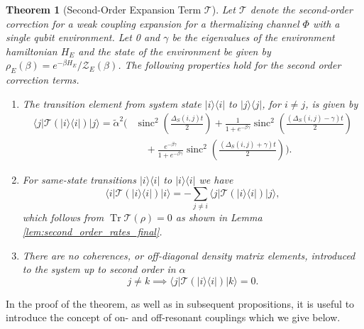 \documentclass[
 amsmath,amssymb,
 aps,
onecolumn, 
nofootinbib]{revtex4-2}
\newtheorem{theorem}{Theorem}
\newcommand{\ket}[1]{|#1\rangle}
\newcommand{\bra}[1]{\langle #1|}
\newcommand{\ketbra}[2]{| #1\rangle\! \langle #2|}
\DeclareMathOperator{\Tr}{Tr}
\newcommand{\partfun}{\mathcal{Z}}
\DeclareMathOperator{\sinc}{sinc}
\begin{document}
\begin{theorem}[Second-Order Expansion Term $\mathcal{T}$] \label{thm:second_order_transition}
Let $\mathcal{T}$ denote the second-order correction for a weak coupling expansion for a thermalizing channel $\Phi$ with a single qubit environment. Let 0 and $\gamma$ be the eigenvalues of the environment hamiltonian $H_E$ and the state of the environment be given by $\rho_E(\beta) = e^{-\beta H_E} / \partfun_E(\beta)$. The following properties hold for the second order correction terms.
\begin{enumerate}
    \item 
The transition element from system state $\ketbra{i}{i}$ to $\ketbra{j}{j}$, for $i \neq j$, is given by
\begin{align}
    \bra{j}\mathcal{T}(\ketbra{i}{i}) \ket{j} = \widetilde{\alpha}^2 \Biggr(& \sinc^2 \left( \frac{\Delta_S(i,j)t}{2} \right) + \frac{1}{1 + e^{-\beta \gamma}} \sinc^2 \left( \frac{(\Delta_S(i,j) - \gamma)t}{2} \right) \nonumber\\
    &\quad+  \frac{e^{-\beta \gamma}}{1 + e^{-\beta \gamma}} \sinc^2 \left( \frac{(\Delta_S(i,j) + \gamma)t}{2} \right) \Biggr). \label{eq:transition_terms_total}
\end{align}
\item For same-state transitions $\ketbra{i}{i}$ to $\ketbra{i}{i}$ we have
\begin{equation}
    \bra{i}\mathcal{T}(\ketbra{i}{i})\ket{i} = - \sum_{j \neq i} \bra{j} \mathcal{T}(\ketbra{i}{i}) \ket{j},
\end{equation}
which follows from $\Tr \mathcal{T}(\rho) = 0$ as shown in Lemma \ref{lem:second_order_rates_final}. 
\item There are no coherences, or off-diagonal density matrix elements, introduced to the system up to second order in $\alpha$
\begin{equation}
    j \neq k \implies \bra{j} \mathcal{T}(\ketbra{i}{i}) \ket{k} = 0.
\end{equation}

\end{enumerate}
\end{theorem}
In the proof of the theorem, as well as in subsequent propositions, it is useful to introduce the concept of on- and off-resonant couplings which we give below.
\end{document}

